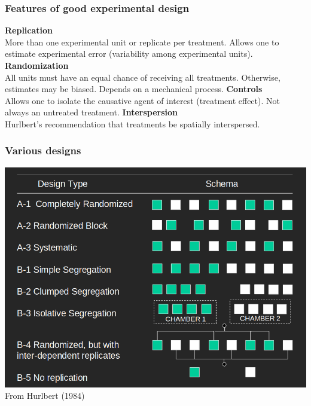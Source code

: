 \documentclass[color=usenames,dvipsnames]{beamer}\usepackage[]{graphicx}\usepackage[]{color}
\begin{document}
\begin{frame}
  \frametitle{Features of good experimental design}
  {\bf Replication} \\
  More than one experimental unit or replicate per treatment. Allows
  one to estimate experimental error (variability among experimental
  units). 
  \vfill
  {\bf Randomization} \\
  All units must have an equal chance of receiving all treatments.
  Otherwise, estimates may be biased.  Depends on a mechanical
  process. 
  \vfill
  {\bf Controls} \\
  Allows one to isolate the causative agent of interest (treatment
  effect).  Not always an untreated treatment. 
  \vfill
  {\bf Interspersion} \\
  Hurlbert's recommendation that treatments be spatially interspersed.  
\end{frame}


\begin{frame}
  \frametitle{Various designs}
  \includegraphics[width=\textwidth]{Hurlbert-schema} \\
  \centering
  From Hurlbert (1984) \\
\end{frame}
\end{document}
